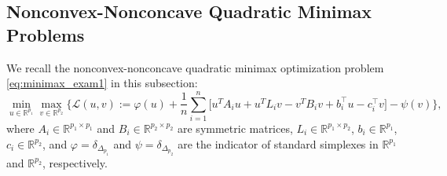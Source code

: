\documentclass{article}
\newcommand{\R}{\mathbb{R}}
\newcommand{\Lc}{\mathcal{L}}
\newcommand{\beforesubsec}{\vspace{-1.5ex}}
\newcommand{\aftersubsec}{\vspace{-1.5ex}}
\theoremstyle{plain}
\theoremstyle{definition}
\theoremstyle{remark}
\begin{document}
\beforesubsec
\subsection{Nonconvex-Nonconcave Quadratic Minimax Problems}\label{apdx:subsec:bilinear_opt}
\aftersubsec
We recall the nonconvex-nonconcave quadratic minimax optimization problem  \eqref{eq:minimax_exam1} in this subsection:
\begin{equation}\label{eq:minimax_exam2_supp}
\min_{u \in \R^{p_1}}\max_{v\in\R^{p_2}} \Big\{ \Lc(u, v) := \varphi(u) + \frac{1}{n}\sum_{i=1}^n\big[u^TA_iu +  u^TL_iv - v^TB_iv  + b_i^{\top}u - c_i^{\top}v\big] - \psi(v) \Big\},
\end{equation}
where $A_i \in \R^{p_1\times p_1}$ and $B_i \in \R^{p_2\times p_2}$ are symmetric matrices, $L_i \in \R^{p_1\times p_2}$, $b_i \in \R^{p_1}$, $c_i \in \R^{p_2}$, and $\varphi = \delta_{\Delta_{p_1}}$ and $\psi =\delta_{\Delta_{p_2}}$ are the indicator of standard simplexes in $\R^{p_1}$ and $\R^{p_2}$, respectively.
\end{document}
